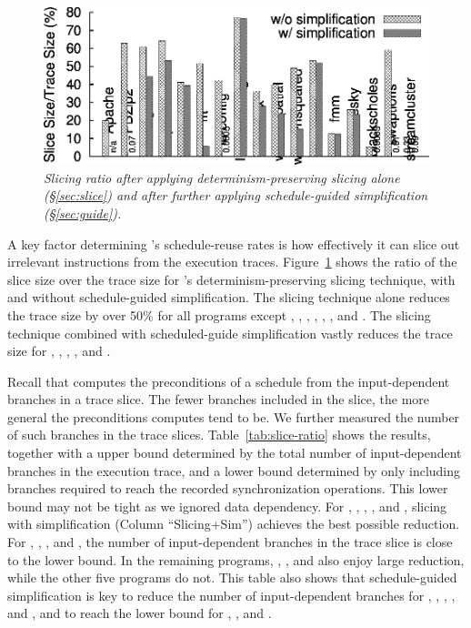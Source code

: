 \begin{figure}[t]
\centering
\includegraphics[width=\columnwidth]{peregrine/figures/slicing.eps}
\vspace{-.3in}
\caption{{\em Slicing ratio after applying determinism-preserving slicing alone 
    (\S\ref{sec:slice}) and after further applying schedule-guided
    simplification (\S\ref{sec:guide}).}} \label{fig:slice-ratio}
\vspace{-.05in}
\end{figure}

A key factor determining \peregrine's schedule-reuse rates is how effectively it
can slice out irrelevant instructions from the execution traces.
Figure~\ref{fig:slice-ratio} shows the ratio of the slice size over the trace size for
\peregrine's determinism-preserving slicing technique, with and without
schedule-guided simplification.  The slicing technique alone reduces the
trace size by over 50\% for all programs except \pbzip, \aget, \pfscan,
\fft, \lun, \ocean, and \swaptions.  The slicing technique combined with
scheduled-guide simplification vastly reduces the trace size for \pbzip,
\aget, \fft, \luc, and \swaptions.

Recall that \peregrine computes the preconditions of a schedule from
the input-dependent branches in a trace slice.  The
fewer branches included in the slice, the more general the preconditions
\peregrine computes tend to be.  We further measured the number of such
branches in the trace slices.  Table~\ref{tab:slice-ratio} shows the
results, together with a upper bound determined by the total number of
input-dependent branches in the execution trace, and a lower bound
determined by only including branches required to reach the recorded
synchronization operations.  This lower bound may not be tight as we ignored data
dependency.  For \barnes, \fft, \blackscholes, \swaptions, and
\streamcluster, slicing with simplification (Column ``Slicing+Sim'')
achieves the best possible reduction.  For \pbzip, \aget, \pfscan, and \luc, the
number of input-dependent branches in the trace slice is close to the
lower bound.  In the remaining programs, \apache, \fmm, and \cholesky
also enjoy large reduction, while the other five programs do not.  This table
also shows that schedule-guided simplification is key to reduce the
number of input-dependent branches for \pbzip, \fft, \luc, \blackscholes, 
and \swaptions,
and to reach the lower bound for \blackscholes, \swaptions, and \streamcluster.

